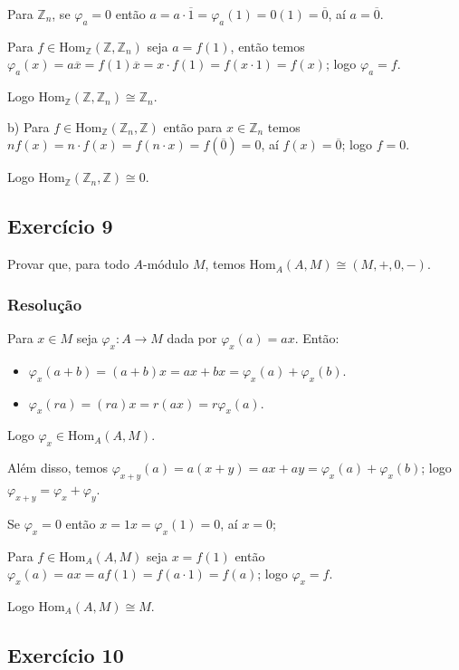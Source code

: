\documentclass[10pt,a4paper]{article}
\begin{document}
\medskip
\noindent
Para $\mathbb{Z}_n$, se $\varphi_a=0$ então $a=a\cdot\overline{1}=\varphi_a(1)=0(1)=\overline{0}$, aí $a=\overline{0}$.

\medskip
\noindent
Para $f\in\mathrm{Hom}_\mathbb{Z}(\mathbb{Z},\mathbb{Z}_n)$ seja $a=f(1)$, então temos $\varphi_a(x)=a\overline{x}=f(1)\overline{x}=x\cdot f(1)=f(x\cdot1)=f(x)$; logo $\varphi_a=f$.

\medskip
\noindent
Logo $\mathrm{Hom}_\mathbb{Z}(\mathbb{Z},\mathbb{Z}_n)\cong\mathbb{Z}_n$.

\medskip
\noindent
b) Para $f\in\mathrm{Hom}_\mathbb{Z}(\mathbb{Z}_n,\mathbb{Z})$ então para $x\in\mathbb{Z}_n$ temos $nf(x)=n\cdot f(x)=f(n\cdot x)=f(\overline{0})=0$, aí $f(x)=\overline{0}$; logo $f=0$.

\medskip
\noindent
Logo $\mathrm{Hom}_\mathbb{Z}(\mathbb{Z}_n,\mathbb{Z})\cong 0$.

\subsection*{Exercício 9}

Provar que, para todo $A$-módulo $M$, temos $\mathrm{Hom}_A(A,M)\cong(M,+,0,-)$.

\subsubsection*{Resolução}

Para $x\in M$ seja $\varphi_x:A\rightarrow M$ dada por $\varphi_x(a)=ax$. Então:
\begin{itemize}
\item $\varphi_x(a+b)=(a+b)x=ax+bx=\varphi_x(a)+\varphi_x(b)$.
\item $\varphi_x(ra)=(ra)x=r(ax)=r\varphi_x(a)$.
\end{itemize}
Logo $\varphi_x\in\mathrm{Hom}_A(A,M)$.

\medskip
\noindent
Além disso, temos $\varphi_{x+y}(a)=a(x+y)=ax+ay=\varphi_{x}(a)+\varphi_{x}(b)$; logo $\varphi_{x+y}=\varphi_x+\varphi_y$.

\medskip
\noindent
Se $\varphi_x=0$ então $x=1x=\varphi_x(1)=0$, aí $x=0$;

\medskip
\noindent
Para $f\in\mathrm{Hom}_A(A,M)$ seja $x=f(1)$ então $\varphi_x(a)=ax=af(1)=f(a\cdot1)=f(a)$; logo $\varphi_x=f$.

\medskip
\noindent
Logo $\mathrm{Hom}_A(A,M)\cong M$.

\subsection*{Exercício 10}
\end{document}
